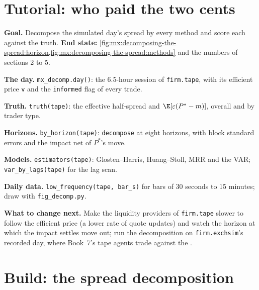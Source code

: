 \section{Tutorial: who paid the two cents}\label{tut:mx:decomposing-the-spread:tut}

\begin{tutorial}
\textbf{Goal.} Decompose the simulated day's spread by every method and score each against the truth.
\textbf{End state:} \cref{fig:mx:decomposing-the-spread:horizon,fig:mx:decomposing-the-spread:methods} and the numbers of sections 2 to 5.
\begin{tutsteps}
\item \textbf{The day.} \texttt{mx\_decomp.day()}: the 6.5-hour session of \texttt{firm.tape}, with its efficient price \texttt{v} and the \texttt{informed}
flag of every trade.
\item \textbf{Truth.} \texttt{truth(tape)}: the effective half-spread and $\E[\varepsilon(P^\ast-m)]$, overall and by trader type.
\item \textbf{Horizons.} \texttt{by\_horizon(tape)}: \texttt{decompose} at eight horizons, with block standard errors and the impact net of $P^\ast$'s move.
\item \textbf{Models.} \texttt{estimators(tape)}: Glosten--Harris, Huang--Stoll, MRR and the VAR; \texttt{var\_by\_lags(tape)} for the lag scan.
\item \textbf{Daily data.} \texttt{low\_frequency(tape, bar\_s)} for bars of 30 seconds to 15 minutes; draw with \texttt{fig\_decomp.py}.
\end{tutsteps}
\textbf{What to change next.} Make the liquidity providers of \texttt{firm.tape} slower to follow the efficient price (a lower rate of quote updates)
and watch the horizon at which the impact settles move out; run the decomposition on \texttt{firm.exchsim}'s recorded day, where Book~7's tape agents
trade against the .
\end{tutorial}

\section{Build: the spread decomposition}\label{bld:mx:decomposing-the-spread:spreaddecomp}


